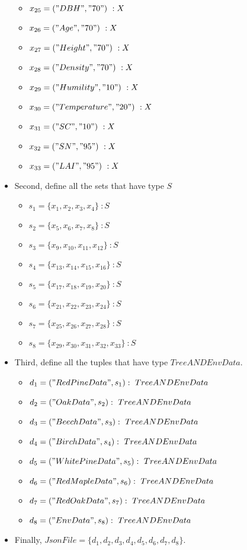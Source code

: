 \documentclass[12pt, titlepage]{article}
\begin{document}
\begin{itemize}
\begin{itemize}
    \renewcommand{\attr}{70}
    \item $x_{25} = ("DBH", "\attr")\ :X$
    \item $x_{26} = ("Age", "\attr")\ :X$
    \item $x_{27} = ("Height", "\attr")\ :X$
    \item $x_{28} = ("Density", "\attr")\ :X$
    \vspace{0.5cm}

    
    \item $x_{29} = ("Humility", "10")\ :X$
    \item $x_{30} = ("Temperature", "20")\ :X$
    \item $x_{31} = ("SC", "10")\ :X$
    \item $x_{32} = ("SN", "95")\ :X$
    \item $x_{33} = ("LAI", "95")\ :X$
\end{itemize}

    \item
Second, define all the sets that have type $S$
\begin{itemize}
    \item $s_1 = \{x_1, x_2, x_3, x_4\}\ :S$
    \item $s_2 = \{x_5, x_6, x_7, x_8\}\ :S$
    \item $s_3 = \{x_9, x_{10}, x_{11}, x_{12}\}\ :S$
    \item $s_4 = \{x_{13}, x_{14}, x_{15}, x_{16}\}\ :S$
    \item $s_5 = \{x_{17}, x_{18}, x_{19}, x_{20}\}\ :S$
    \item $s_6 = \{x_{21}, x_{22}, x_{23}, x_{24}\}\ :S$
    \item $s_7 = \{x_{25}, x_{26}, x_{27}, x_{28}\}\ :S$
    \item $s_8 = \{x_{29}, x_{30}, x_{31}, x_{32}, x_{33}\}\ :S$
\end{itemize}
    \newpage
    \item
Third, define all the tuples that have type $TreeANDEnvData$.
\begin{itemize}
    \item $d_1 = ("RedPineData", s_1):\ TreeANDEnvData$
    \item $d_2 = ("OakData", s_2):\ TreeANDEnvData$
    \item $d_3 = ("BeechData", s_3):\ TreeANDEnvData$
    \item $d_4 = ("BirchData", s_4):\ TreeANDEnvData$
    \item $d_5 = ("WhitePineData", s_5):\ TreeANDEnvData$
    \item $d_6 = ("RedMapleData", s_6):\ TreeANDEnvData$
    \item $d_7 = ("RedOakData", s_7):\ TreeANDEnvData$
    \item $d_8 = ("EnvData", s_8):\ TreeANDEnvData$
\end{itemize}
    \item
    Finally, $JsonFile = \{d_1, d_2, d_3, d_4, d_5, d_6,
    d_7, d_8\}.$
\end{itemize}
\end{document}

